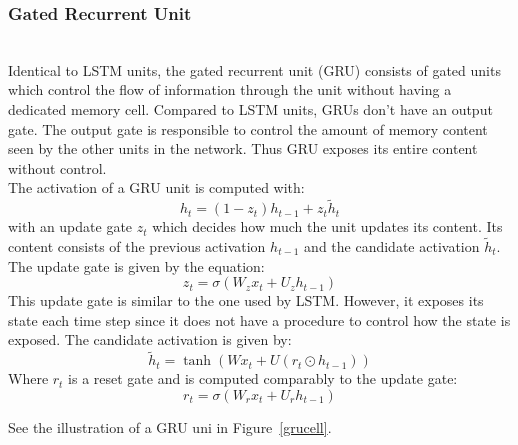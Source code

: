 
\subsubsection{Gated Recurrent Unit}~\\

Identical to LSTM units, the gated recurrent unit (GRU) consists of gated units
which control the flow of information through the unit without having a
dedicated memory cell. Compared to LSTM units, GRUs don't have an output gate.
The output gate is responsible to control the amount of memory content seen by
the other units in the network. Thus GRU exposes its entire content without
control.~\cite{DBLP:journals/corr/ChungGCB14}\\

The activation of a GRU unit is computed with:
\begin{equation}
  h_t = (1-z_t)h_{t-1} + z_t\tilde{h}_t
\end{equation}
with an update gate $z_t$ which decides how much the unit updates its content.
Its content consists of the previous activation $h_{t-1}$ and the candidate
activation $\tilde{h}_t$. The update gate is given by the equation:
\begin{equation}
  z_t=\sigma(W_z x_t+U_z h_{t-1}) 
\end{equation}
This update gate is similar to the one used by LSTM. However, it exposes its
state each time step since it does not have a procedure to control how the state
is exposed. The candidate activation is given by:
\begin{equation}
  \tilde{h}_t=\tanh(Wx_t+U(r_t\odot h_{t-1}))
\end{equation}
Where $r_t$ is a reset gate and is computed comparably to the update gate:
\begin{equation}
  r_t=\sigma(W_r x_t+U_r h_{t-1})
\end{equation}

See the illustration of a GRU uni in Figure~\ref{grucell}.


